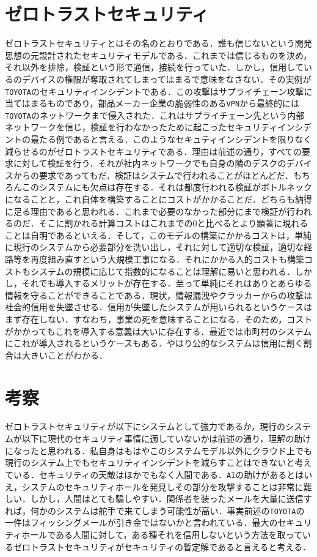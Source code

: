 \documentclass[paper=a4, fontsize=10pt]{jlreq}
\begin{document}
\section{ゼロトラストセキュリティ}
ゼロトラストセキュリティとはその名のとおりである．誰も信じないという開発思想の元設計されたセキュリティモデルである．これまでは信じるものを決め，それ以外を排除，検証という形で通信，接続を行っていた．しかし，信用しているのデバイスの権限が奪取されてしまってはまるで意味をなさない．その実例が\texttt{TOYOTA}のセキュリティインシデントである\cite{nikkei_xtech_2022}．この攻撃はサプライチェーン攻撃に当てはまるものであり，部品メーカー企業の脆弱性のある\texttt{VPN}から最終的には\texttt{TOYOTA}のネットワークまで侵入された．これはサプライチェーン先という内部ネットワークを信じ，検証を行わなかったために起こったセキュリティインシデントの最たる例であると言える．このようなセキュティインシデントを限りなく減らせるのがゼロトラストセキュリティである．理由は前述の通り，すべての要求に対して検証を行う．それが社内ネットワークでも自身の隣のデスクのデバイスからの要求であってもだ．検証はシステムで行われることがほとんどだ．もちろんこのシステムにも欠点は存在する．それは都度行われる検証がボトルネックになることと，これ自体を構築することにコストがかかることだ．どちらも納得に足る理由であると思われる．これまで必要のなかった部分にまで検証が行われるのだ．そこに割かれる計算コストはこれまでの$0$と比べるとより顕著に現れることは自明であるといえる．そして，このモデルの構築にかかるコストは，単純に現行のシステムから必要部分を洗い出し，それに対して適切な検証，適切な経路等を再度組み直すという大規模工事になる．それにかかる人的コストも構築コストもシステムの規模に応じて指数的になることは理解に易いと思われる．しかし，それでも導入するメリットが存在する．至って単純にそれはありとあらゆる情報を守ることができることである．現状，情報漏洩やクラッカーからの攻撃は社会的信用を失墜させる．信用が失墜したシステムが用いられるというケースはまず存在しない．すなわち，事業の死を意味することになる．そのため，コストがかかってもこれを導入する意義は大いに存在する．最近では市町村のシステムにこれが導入されるというケースもある．やはり公的なシステムは信用に割く割合は大きいことがわかる．

\section{考察}
ゼロトラストセキュリティが以下にシステムとして強力であるか，現行のシステムが以下に現代のセキュリティ事情に適していないかは前述の通り，理解の助けになったと思われる．私自身はもはやこのシステムモデル以外にクラウド上でも現行のシステム上でもセキュリティインシデントを減らすことはできないと考えている．セキュリティの天敵はほかでもなく人間である．\texttt{AI}の助けがあるとはいえ，システムのセキュリティホールを発見しその部分を攻撃することは非常に難しい．しかし，人間はとても騙しやすい．関係者を装ったメールを大量に送信すれば，何かのシステムは舵手で来てしまう可能性が高い．事実前述の\texttt{TOYOTA}の一件はフィッシングメールが引き金ではないかと言われている．最大のセキュリティホールである人間に対して，ある種それを信用しないという方法を取っているゼロトラストセキュリティがセキュリティの暫定解であると言えると考える．
\end{document}
